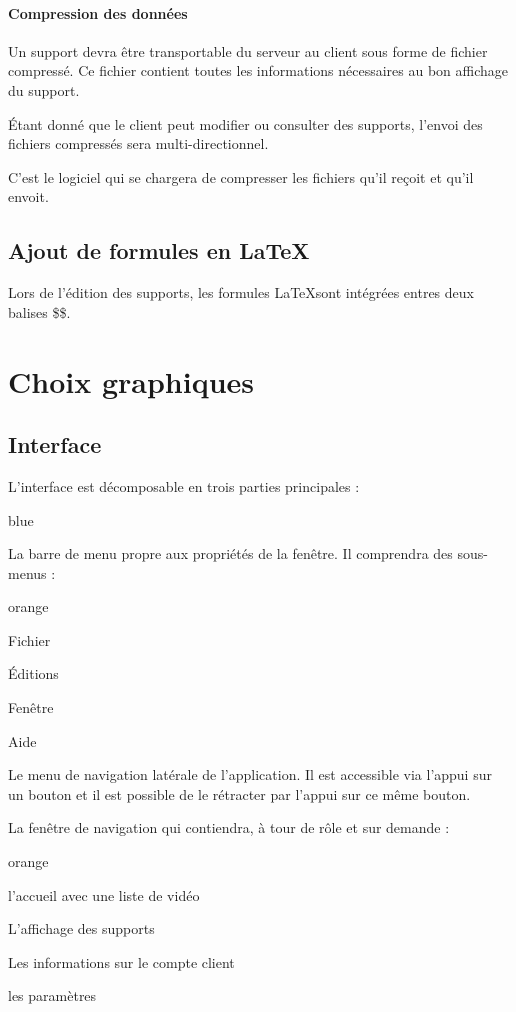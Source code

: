 {\subsubsection{Compression des données}

Un support devra être transportable du serveur au client sous forme de fichier compressé. Ce fichier contient toutes les informations nécessaires au bon affichage du support.

Étant donné que le client peut modifier ou consulter des supports, l'envoi des fichiers compressés sera multi-directionnel.

C'est le logiciel qui se chargera de compresser les fichiers qu'il reçoit et qu'il envoit.


\section{Ajout de formules en \LaTeX}

Lors de l'édition des supports, les formules \LaTeX sont intégrées entres deux balises \$\$.


\chapter{Choix graphiques}

\section{Interface}

L'interface est décomposable en trois parties principales :

\begin{items}{blue}{\Triangle}
\item La barre de menu propre aux propriétés de la fenêtre. Il comprendra des sous-menus : 
 \begin{items}{orange}{\Circle}
    \item Fichier
    \item Éditions
    \item Fenêtre
    \item Aide
 \end{items}
 
 \item Le menu de navigation latérale de l'application. Il est accessible via l'appui sur un bouton et il est possible de le rétracter par l'appui sur ce même bouton.
 \item La fenêtre de navigation qui contiendra, à tour de rôle et sur demande : 
  \begin{items}{orange}{\Circle}
    \item l'accueil avec une liste de vidéo
    \item L'affichage des supports
    \item Les informations sur le compte client
    \item les paramètres
 \end{items}
 

\end{items}}
